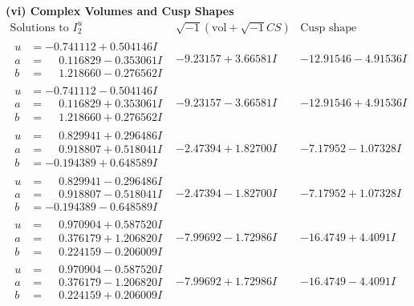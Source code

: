 \documentclass[1p]{elsarticle_modified}
\theoremstyle{definition}
\newcommand{\I}{\sqrt{-1}}
\begin{document}
\newpage\flushleft \textbf{(vi) Complex Volumes and Cusp Shapes}
$$\begin{array}{c|c|c}  
\text{Solutions to }I^u_{2}& \I (\text{vol} + \sqrt{-1}CS) & \text{Cusp shape}\\
 \hline 
\begin{aligned}
u &= -0.741112 + 0.504146 I \\
a &= \phantom{-}0.116829 - 0.353061 I \\
b &= \phantom{-}1.218660 - 0.276562 I\end{aligned}
 & -9.23157 + 3.66581 I & -12.91546 - 4.91536 I \\ \hline\begin{aligned}
u &= -0.741112 - 0.504146 I \\
a &= \phantom{-}0.116829 + 0.353061 I \\
b &= \phantom{-}1.218660 + 0.276562 I\end{aligned}
 & -9.23157 - 3.66581 I & -12.91546 + 4.91536 I \\ \hline\begin{aligned}
u &= \phantom{-}0.829941 + 0.296486 I \\
a &= \phantom{-}0.918807 + 0.518041 I \\
b &= -0.194389 + 0.648589 I\end{aligned}
 & -2.47394 + 1.82700 I & -7.17952 - 1.07328 I \\ \hline\begin{aligned}
u &= \phantom{-}0.829941 - 0.296486 I \\
a &= \phantom{-}0.918807 - 0.518041 I \\
b &= -0.194389 - 0.648589 I\end{aligned}
 & -2.47394 - 1.82700 I & -7.17952 + 1.07328 I \\ \hline\begin{aligned}
u &= \phantom{-}0.970904 + 0.587520 I \\
a &= \phantom{-}0.376179 + 1.206820 I \\
b &= \phantom{-}0.224159 - 0.206009 I\end{aligned}
 & -7.99692 - 1.72986 I & -16.4749 + 4.4091 I \\ \hline\begin{aligned}
u &= \phantom{-}0.970904 - 0.587520 I \\
a &= \phantom{-}0.376179 - 1.206820 I \\
b &= \phantom{-}0.224159 + 0.206009 I\end{aligned}
 & -7.99692 + 1.72986 I & -16.4749 - 4.4091 I \\ \hline\begin{aligned}

\end{aligned}
\end{array}$$
\end{document}
